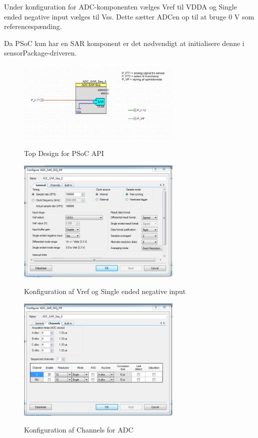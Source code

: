 Under konfiguration for ADC-komponenten vælges Vref til VDDA og Single ended negative input vælges til Vss. Dette sætter ADCen op til at bruge 0 V som referencespænding.

Da PSoC kun har en SAR komponent er det nødvendigt at initialisere denne i sensorPackage-driveren.

\begin{figure}[htb]
\centering
{\includegraphics[width=0.70\textwidth]{filer/pics/psoc_api_topdesign.png}}
\caption{Top Design for PSoC API}
\label{lab:psoc_api_topdesign}
\end{figure}

\begin{figure}[htb]
\centering
{\includegraphics[width=0.70\textwidth]{filer/pics/psoc_api_config1.png}}
\caption{Konfiguration af Vref og Single ended negative input}
\label{lab:psoc_api_config1}
\end{figure}

\begin{figure}[htb]
\centering
{\includegraphics[width=0.70\textwidth]{filer/pics/psoc_api_config2.png}}
\caption{Konfiguration af Channels for ADC}
\label{lab:psoc_api_config2}
\end{figure}